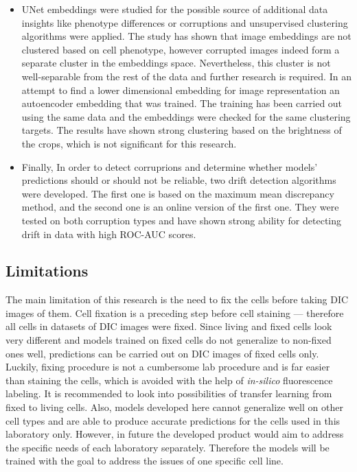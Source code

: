 \begin{itemize}
    \item UNet embeddings were studied for the possible source of additional data insights like phenotype differences or corruptions and unsupervised clustering algorithms were applied. The study has shown that image embeddings are not clustered based on cell phenotype, however corrupted images indeed form a separate cluster in the embeddings space. Nevertheless, this cluster is not well-separable from the rest of the data and further research is required. In an attempt to find a lower dimensional embedding for image representation an autoencoder embedding that was trained. The training has been carried out using the same data and the embeddings were checked for the same clustering targets. The results have shown strong clustering based on the brightness of the crops, which is not significant for this research.
    
    \item Finally, In order to detect corruprions and determine whether models' predictions should or should not be reliable, two drift detection algorithms were developed. The first one is based on the maximum mean discrepancy method, and the second one is an online version of the first one. They were tested on both corruption types and have shown strong ability for detecting drift in data with high ROC-AUC scores.
\end{itemize}

\subsection{Limitations}
The main limitation of this research is the need to fix the cells before taking DIC images of them. Cell fixation is a preceding step before cell staining --- therefore all cells in datasets of DIC images were fixed. Since living and fixed cells look very different and models trained on fixed cells do not generalize to non-fixed ones well, predictions can be carried out on DIC images of fixed cells only. Luckily, fixing procedure is not a cumbersome lab procedure and is far easier than staining the cells, which is avoided with the help of \textit{in-silico} fluorescence labeling. It is recommended to look into possibilities of transfer learning from fixed to living cells. 
Also, models developed here cannot generalize well on other cell types and are able to produce accurate predictions for the cells used in this laboratory only. However, in future the developed product would aim to address the specific needs of each laboratory separately. Therefore the models will be trained with the goal to address the issues of one specific cell line. 


